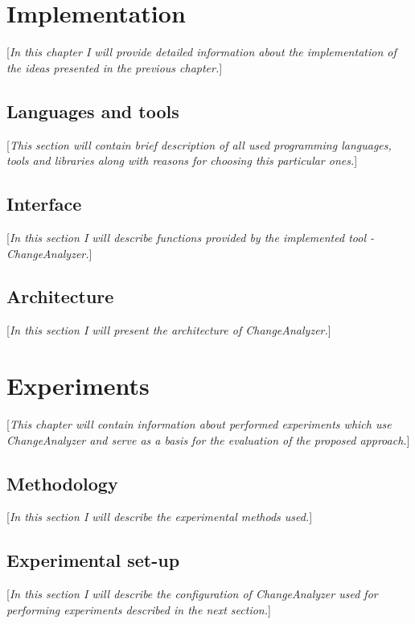 \documentclass{pracamgr}
\begin{document}
\chapter{Implementation}
\label{cha:implementation}
[\textit{In this chapter I will provide detailed information about the implementation of the ideas presented in the previous chapter.}]

\section{Languages and tools}
\label{sec:languagess}
[\textit{This section will contain brief description of all used programming languages, tools and libraries along with reasons for choosing this particular ones.}]

\section{Interface}
\label{sec:interface}
[\textit{In this section I will describe functions provided by the implemented tool - ChangeAnalyzer.}]

\section{Architecture}
\label{sec:architecture}
[\textit{In this section I will present the architecture of ChangeAnalyzer.}]

\chapter{Experiments}
\label{cha:experiments}
[\textit{This chapter will contain information about performed experiments which use ChangeAnalyzer and serve as a basis for the evaluation of the proposed approach.}]

\section{Methodology}
\label{sec:methodology}
[\textit{In this section I will describe the experimental methods used.}]

\section{Experimental set-up}
\label{sec:set-up}
[\textit{In this section I will describe the configuration of ChangeAnalyzer used for performing experiments described in the next section.}]
\end{document}

